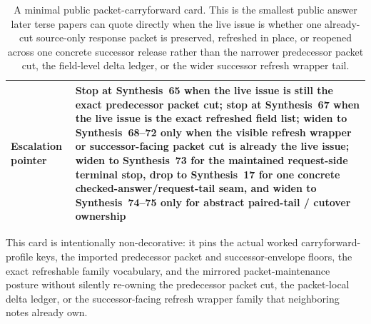 \documentclass[11pt]{article}
\begin{document}
\begin{table}[t]
\begin{tabularx}{\linewidth}{@{}l X@{}}
Escalation pointer & Stop at Synthesis~65 when the live issue is still the exact predecessor packet cut; stop at Synthesis~67 when the live issue is the exact refreshed field list; widen to Synthesis~68--72 only when the visible refresh wrapper or successor-facing packet cut is already the live issue; widen to Synthesis~73 for the maintained request-side terminal stop, drop to Synthesis~17 for one concrete checked-answer/request-tail seam, and widen to Synthesis~74--75 only for abstract paired-tail / cutover ownership \\
\bottomrule
\end{tabularx}
\caption{A minimal public packet-carryforward card. This is the smallest public answer later terse papers can quote directly when the live issue is whether one already-cut source-only response packet is preserved, refreshed in place, or reopened across one concrete successor release rather than the narrower predecessor packet cut, the field-level delta ledger, or the wider successor refresh wrapper tail.}
\label{tab:minimal-public-packet-carryforward-card}
\end{table}

This card is intentionally non-decorative: it pins the actual worked carryforward-profile keys, the imported predecessor packet and successor-envelope floors, the exact refreshable family vocabulary, and the mirrored packet-maintenance posture without silently re-owning the predecessor packet cut, the packet-local delta ledger, or the successor-facing refresh wrapper family that neighboring notes already own.\cite{series:workedexample}
\end{document}
